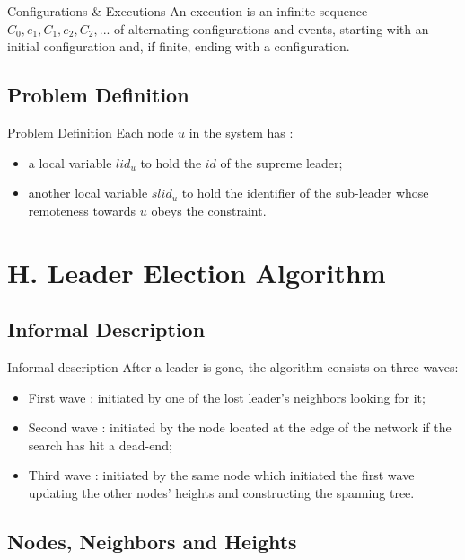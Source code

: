 \documentclass{beamer}
\begin{document}
\begin{frame}{Configurations \& Executions}
	An execution is an infinite sequence $C_0, e_1 ,C_1, e_2, C_2 , ...$ of alternating configurations and events, starting with an initial configuration and, if finite, ending with a configuration.
\end{frame}


\subsection{Problem Definition}
\begin{frame}{Problem Definition}
Each node $u$ in the system has :
\begin{itemize}
	\item a local variable $lid_{u}$ to hold the $id$ of the supreme leader;
	\item another local variable $slid_u$ to hold the identifier of the sub-leader whose remoteness towards $u$ obeys the constraint.
\end{itemize}
\end{frame}

\section{H. Leader Election Algorithm}
\subsection{Informal Description}
\begin{frame}{Informal description}
After a leader is gone, the algorithm consists on three waves:
\begin{itemize}
	\item First wave : initiated by one of the lost leader's neighbors looking for it;
	\item Second wave : initiated by the node located at the edge of the network if the search has hit a dead-end;
	\item Third wave : initiated by the same node which initiated the first wave updating the other nodes' heights and constructing the spanning tree.
\end{itemize}

\end{frame}

\subsection{Nodes, Neighbors and Heights}
\end{document}
